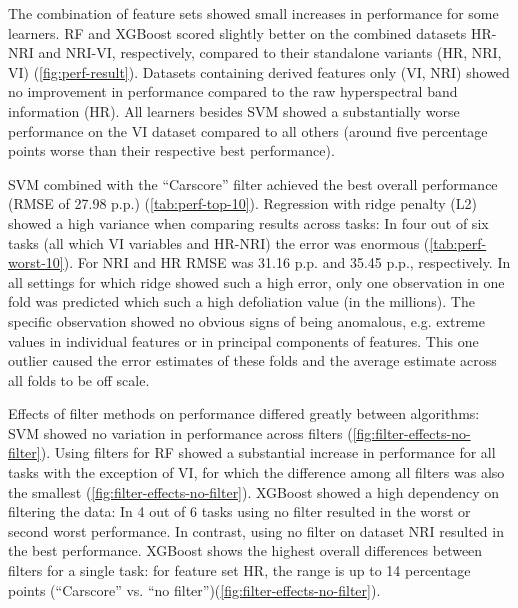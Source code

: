\documentclass[letterpaper, peerreview, draftcls]{IEEEtran}
\begin{document}
The combination of feature sets showed small increases in performance for some learners.
RF and XGBoost scored slightly better on the combined datasets HR-NRI and NRI-VI, respectively, compared to their standalone variants (HR, NRI, VI) (\autoref{fig:perf-result}).
Datasets containing derived features only (VI, NRI) showed no improvement in performance compared to the raw hyperspectral band information (HR).
All learners besides SVM showed a substantially worse performance on the VI dataset compared to all others (around five percentage points worse than their respective best performance).

SVM combined with the \enquote{Carscore} filter achieved the best overall performance (RMSE of 27.98 p.p.) (\autoref{tab:perf-top-10}).
Regression with ridge penalty (L2) showed a high variance when comparing results across tasks: In four out of six tasks (all which VI variables and HR-NRI) the error was enormous (\autoref{tab:perf-worst-10}).
For NRI and HR RMSE was 31.16 p.p. and 35.45 p.p., respectively.
In all settings for which ridge showed such a high error, only one observation in one fold was predicted which such a high defoliation value (in the millions).
The specific observation showed no obvious signs of being anomalous, e.g. extreme values in individual features or in principal components of features.
This one outlier caused the error estimates of these folds and the average estimate across all folds to be off scale.

Effects of filter methods on performance differed greatly between algorithms:
SVM showed no variation in performance across filters (\autoref{fig:filter-effects-no-filter}).
Using filters for RF showed a substantial increase in performance for all tasks with the exception of VI, for which the difference among all filters was also the smallest (\autoref{fig:filter-effects-no-filter}).
XGBoost showed a high dependency on filtering the data: In 4 out of 6 tasks using no filter resulted in the worst or second worst performance.
In contrast, using no filter on dataset NRI resulted in the best performance.
XGBoost shows the highest overall differences between filters for a single task:
for feature set HR, the range is up to 14 percentage points (\enquote{Carscore} vs. \enquote{no filter})(\autoref{fig:filter-effects-no-filter}).
\end{document}
